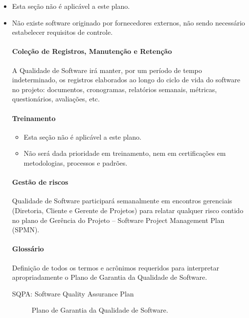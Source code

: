 \begin{itemize}
\item Esta seção não é aplicável a este plano.

\item Não existe software originado por fornecedores externos, não sendo necessário estabelecer requisitos de controle.

\paragraph{Coleção de Registros, Manutenção e Retenção}

A Qualidade de Software irá manter, por um período de tempo indeterminado, os registros elaborados ao longo do ciclo de vida do software no projeto: documentos, cronogramas, relatórios semanais, métricas, questionários, avaliações, etc.

\paragraph{Treinamento}

\begin{itemize}
\item Esta seção não é aplicável a este plano.

\item Não será dada prioridade em treinamento, nem em certificações em metodologias, processos e padrões.
\end{itemize}

\paragraph{Gestão de riscos}

Qualidade de Software participará semanalmente em encontros gerenciais (Diretoria, Cliente e Gerente de Projetos) para relatar qualquer risco contido no plano de Gerência do Projeto – Software Project Management Plan (SPMN).

\paragraph{Glossário}

Definição de todos os termos e acrônimos requeridos para interpretar apropriadamente o Plano de Garantia da Qualidade de Software.

\begin{description}
\item [SQPA: Software Quality Assurance Plan] Plano de Garantia da Qualidade de Software.


\end{description}
\end{itemize}
